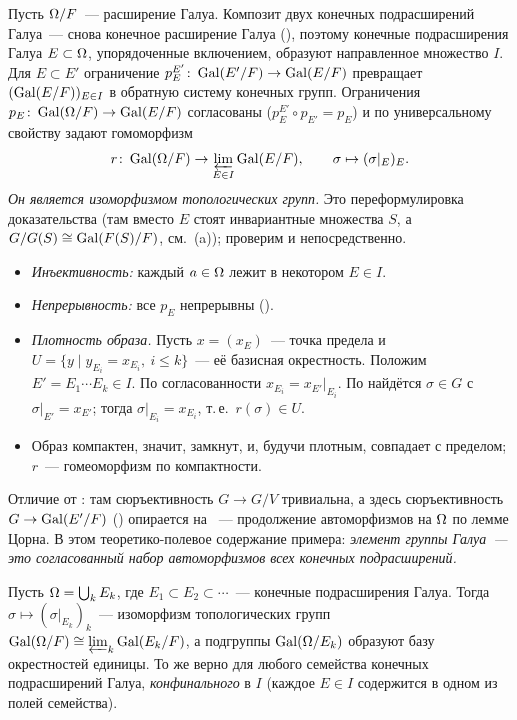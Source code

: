 \begin{example}
Пусть $\Omega/F$~--- расширение Галуа. Композит двух конечных подрасширений Галуа~--- снова конечное расширение Галуа (),
поэтому конечные подрасширения Галуа $E\subset\Omega$, упорядоченные включением, образуют направленное множество $I$. Для
$E\subset E'$ ограничение $p^{E'}_E\colon\operatorname{Gal}(E'/F)\to\operatorname{Gal}(E/F)$ превращает $(\operatorname{Gal}(E/F))_{E\in I}$ в обратную систему
конечных групп. Ограничения $p_E\colon\operatorname{Gal}(\Omega/F)\to\operatorname{Gal}(E/F)$ согласованы ($p^{E'}_E\circ p_{E'}=p_E$) и по
универсальному свойству задают гомоморфизм
\[
r\colon\operatorname{Gal}(\Omega/F)\to\varprojlim_{E\in I}\operatorname{Gal}(E/F),\qquad\sigma\mapsto(\sigma|_E)_E .
\]
\emph{Он является изоморфизмом топологических групп.} Это переформулировка доказательства  (там вместо $E$ стоят
инвариантные множества $S$, а $G/G(S)\cong\operatorname{Gal}(F(S)/F)$, см.\ (a)); проверим и непосредственно.
\begin{itemize}[leftmargin=*]
\item \emph{Инъективность:} каждый $a\in\Omega$ лежит в некотором $E\in I$.
\item \emph{Непрерывность:} все $p_E$ непрерывны ().
\item \emph{Плотность образа.} Пусть $x=(x_E)$~--- точка предела и $U=\{y\mid y_{E_i}=x_{E_i},\ i\le k\}$~--- её базисная
окрестность. Положим $E'=E_1\cdots E_k\in I$. По согласованности $x_{E_i}=x_{E'}|_{E_i}$. По  найдётся $\sigma\in G$
с $\sigma|_{E'}=x_{E'}$; тогда $\sigma|_{E_i}=x_{E_i}$, т.\,е.\ $r(\sigma)\in U$.
\item Образ компактен, значит, замкнут, и, будучи плотным, совпадает с пределом; $r$~--- гомеоморфизм по компактности.
\end{itemize}
Отличие от : там сюръективность $G\to G/V$ тривиальна, а здесь сюръективность $G\to\operatorname{Gal}(E'/F)$ () опирается на
~--- продолжение автоморфизмов на $\Omega$ по лемме Цорна. В этом теоретико-полевое содержание примера: \emph{элемент
группы Галуа~--- это согласованный набор автоморфизмов всех конечных подрасширений.}
\end{example}

\begin{lemma}[7.26a: конфинальность]
Пусть $\Omega=\bigcup_kE_k$, где $E_1\subset E_2\subset\cdots$~--- конечные подрасширения Галуа. Тогда
$\sigma\mapsto(\sigma|_{E_k})_k$~--- изоморфизм топологических групп $\operatorname{Gal}(\Omega/F)\cong\varprojlim_k\operatorname{Gal}(E_k/F)$, а
подгруппы $\operatorname{Gal}(\Omega/E_k)$ образуют базу окрестностей единицы. То же верно для любого семейства конечных подрасширений
Галуа, \emph{конфинального} в $I$ (каждое $E\in I$ содержится в одном из полей семейства).
\end{lemma}

